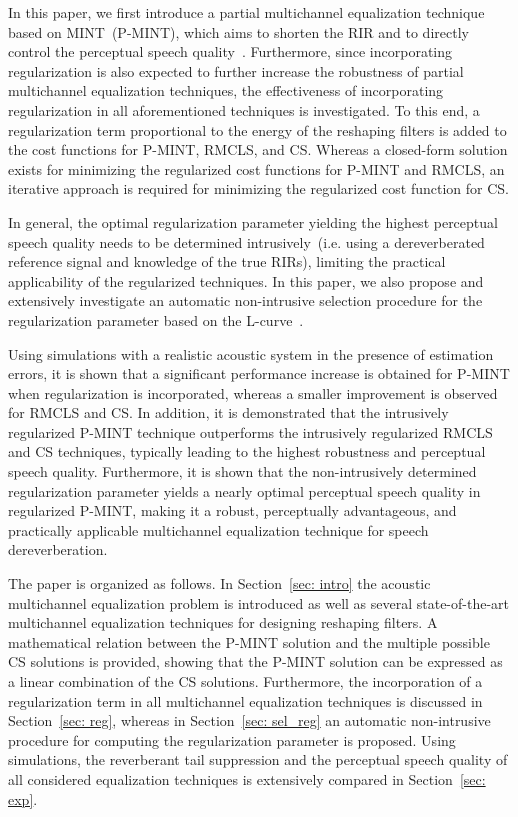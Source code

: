 \documentclass[10pt]{IEEEtran}
\begin{document}
In this paper, we first introduce a partial multichannel equalization technique based on MINT~(P-MINT), which aims to shorten the RIR and to directly control the perceptual speech quality~\cite{Kodrasi_ICASSP_2012}.
Furthermore, since incorporating regularization is also expected to further increase the robustness of partial multichannel equalization techniques, the effectiveness of incorporating regularization in all aforementioned techniques is investigated.
To this end, a regularization term proportional to the energy of the reshaping filters is added to the cost functions for P-MINT, RMCLS, and CS.
Whereas a closed-form solution exists for minimizing the regularized cost functions for P-MINT and RMCLS, an iterative approach is required for minimizing the regularized cost function for CS.

In general, the optimal regularization parameter yielding the highest perceptual speech quality needs to be determined intrusively~(i.e. using a dereverberated reference signal and knowledge of the true RIRs), limiting the practical applicability of the regularized techniques.
In this paper, we also propose and extensively investigate an automatic non-intrusive selection procedure for the regularization parameter based on the L-curve~\cite{Hansen_1993}.

Using simulations with a realistic acoustic system in the presence of estimation errors, it is shown that a significant performance increase is obtained for P-MINT when regularization is incorporated, whereas a smaller improvement is observed for RMCLS and CS.
In addition, it is demonstrated that the intrusively regularized P-MINT technique outperforms the intrusively regularized RMCLS and CS techniques, typically leading to the highest robustness and perceptual speech quality.
Furthermore, it is shown that the non-intrusively determined regularization parameter yields a nearly optimal perceptual speech quality in regularized P-MINT, making it a robust, perceptually advantageous, and practically applicable multichannel equalization technique for speech dereverberation.

The paper is organized as follows.
In Section~\ref{sec: intro} the acoustic multichannel equalization problem is introduced as well as several state-of-the-art multichannel equalization  techniques for designing reshaping filters.
A mathematical relation between the P-MINT solution and the multiple possible CS solutions is provided, showing that the P-MINT solution can be expressed as a linear combination of the CS solutions.
Furthermore, the incorporation of a regularization term in all multichannel equalization techniques is discussed in Section~\ref{sec: reg}, whereas in  Section~\ref{sec: sel_reg} an automatic non-intrusive procedure for computing the regularization parameter is proposed.
Using simulations, the reverberant tail suppression and the perceptual speech quality of all considered equalization techniques is extensively compared in Section~\ref{sec: exp}.
\end{document}
